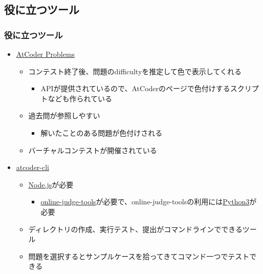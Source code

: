 \documentclass[t, aspectratio=169, dvipdfmx]{beamer}
\begin{document}
\subsection{役に立つツール}
\begin{frame}
  \frametitle{役に立つツール}
  \begin{itemize}
    \item \href{https://kenkoooo.com/atcoder}{AtCoder Problems}
    \begin{itemize}
      \item コンテスト終了後、問題のdifficultyを推定して色で表示してくれる
      \begin{itemize}
        \item APIが提供されているので、AtCoderのページで色付けするスクリプトなども作られている
      \end{itemize}
      \item 過去問が参照しやすい
      \begin{itemize}
        \item 解いたことのある問題が色付けされる
      \end{itemize}
      \item バーチャルコンテストが開催されている
    \end{itemize}
    \item \href{https://www.npmjs.com/package/atcoder-cli}{atcoder-cli}
    \begin{itemize}
      \item \href{https://nodejs.org/ja/}{Node.js}が必要
      \begin{itemize}
        \item \href{https://github.com/online-judge-tools/oj}{online-judge-tools}が必要で、online-judge-toolsの利用には\href{https://www.python.jp/}{Python3}が必要
      \end{itemize}
      \item ディレクトリの作成、実行テスト、提出がコマンドラインでできるツール
      \item 問題を選択するとサンプルケースを拾ってきてコマンド一つでテストできる
    \end{itemize}
  \end{itemize}
\end{frame}
\end{document}
